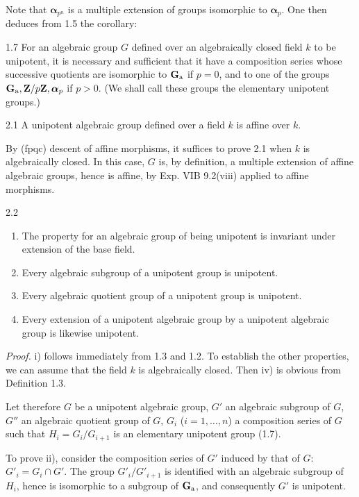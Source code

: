 Note that $\boldsymbol\alpha_{p^n}$ is a multiple extension of groups isomorphic to $\boldsymbol\alpha_p$. One then deduces from 1.5 the corollary:
\begin{corollary}{1.7}\label{XVII.1.7}
For an algebraic group $G$ defined over an algebraically closed field $k$ to be unipotent, it is necessary and sufficient that it have a composition series whose successive quotients are isomorphic to $\mathbf{G}_{\mathrm{a}}$ if $p=0$, and to one of the groups $\mathbf{G}_{\mathrm{a}},\mathbf{Z}/p\mathbf{Z},\boldsymbol\alpha_p$ if $p>0$. (We shall call these groups the elementary unipotent groups.)
\end{corollary}

\begin{proposition}{2.1}\label{XVII.2.1}
A unipotent algebraic group defined over a field $k$ is affine over $k$.
\end{proposition}
By (fpqc) descent of affine morphisms, it suffices to prove 2.1 when $k$ is algebraically closed. In this case, $G$ is, by definition, a multiple extension of affine algebraic groups, hence is affine, by Exp. VIB 9.2(viii) applied to affine morphisms.

\begin{proposition}{2.2}\label{XVII.2.2}
\begin{enumerate}[label=\textup{\roman*)}]
\item The property for an algebraic group of being unipotent is invariant under extension of the base field.
\item Every algebraic subgroup of a unipotent group is unipotent.
\item Every algebraic quotient group of a unipotent group is unipotent.
\item Every extension of a unipotent algebraic group by a unipotent algebraic group is likewise unipotent.
\end{enumerate}
\end{proposition}
\noindent\emph{Proof.} i) follows immediately from 1.3 and 1.2. To establish the other properties, we can assume that the field $k$ is algebraically closed. Then iv) is obvious from Definition 1.3.

Let therefore $G$ be a unipotent algebraic group, $G'$ an algebraic subgroup of $G$, $G''$ an algebraic quotient group of $G$, $G_i$ ($i=1,\ldots,n$) a composition series of $G$ such that $H_i=G_i/G_{i+1}$ is an elementary unipotent group (1.7).

To prove ii), consider the composition series of $G'$ induced by that of $G$: $G'_i=G_i\cap G'$. The group $G'_i/G'_{i+1}$ is identified with an algebraic subgroup of $H_i$, hence is isomorphic to a subgroup of $\mathbf{G}_{\mathrm{a}}$, and consequently $G'$ is unipotent.

